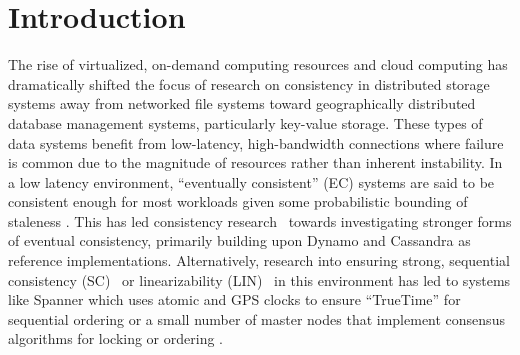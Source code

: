 \documentclass{article}
\begin{document}
\newpage
\thispagestyle{empty}
\mbox{}

\newpage
\setcounter{tocdepth}{3}
\tableofcontents

\newpage
\listoffigures

\newpage
\onehalfspacing

\section{Introduction}
\label{sec:introduction}

The rise of virtualized, on-demand computing resources and cloud computing has dramatically shifted the focus of research on consistency in distributed storage systems away from networked file systems toward geographically distributed database management systems, particularly key-value storage. These types of data systems benefit from low-latency, high-bandwidth connections where failure is common due to the magnitude of resources rather than inherent instability. In a low latency environment, ``eventually consistent'' (EC) \cite{vogels_eventually_2009} systems are said to be consistent enough for most workloads given some probabilistic bounding of staleness \cite{bailis_quantifying_2014,bermbach_eventual_2011,bailis_probabilistically_2012}. This has led consistency research~\cite{bailis_highly_2013,bailis_coordination-avoiding_2014,mahajan2011consistency,alvaro2013consistency,zawirski2015write} towards investigating stronger forms of eventual consistency, primarily building upon Dynamo \cite{decandia_dynamo:_2007} and Cassandra \cite{lakshman_cassandra:_2010} as reference implementations. Alternatively, research into ensuring strong, sequential consistency (SC)~\cite{sequential-consistency} or linearizability (LIN)~\cite{herlihy_linearizability:_1990} in this environment has led to systems like Spanner \cite{corbett_spanner:_2013} which uses atomic and GPS clocks to ensure ``TrueTime'' for sequential ordering or a small number of master nodes that implement consensus algorithms \cite{lamport_paxos_2001,ongaro_search_2014} for locking or ordering \cite{kraska_mdcc:_2013}.
\end{document}
